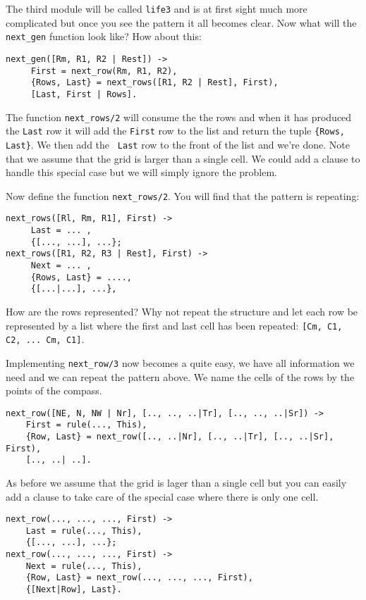 \documentclass[a4paper,11pt]{article}
\begin{document}
The third module will be called {\tt life3} and is at first sight much
more complicated but once you see the pattern it all becomes
clear. Now what will the {\tt next\_gen} function look like? How
about this:

\begin{verbatim}
next_gen([Rm, R1, R2 | Rest]) ->
     First = next_row(Rm, R1, R2),
     {Rows, Last} = next_rows([R1, R2 | Rest], First),
     [Last, First | Rows].
\end{verbatim}

The function {\tt next\_rows/2} will consume the the rows and when it
has produced the {\tt Last} row it will add the {\tt First} row to the
list and return the tuple {\tt\{Rows, Last\}}. We then add the {\tt
  Last} row to the front of the list and we're done. Note that we
assume that the grid is larger than a single cell. We could add a
clause to handle this special case but we will simply ignore the problem.

Now define the function {\tt next\_rows/2}. You will find that the
pattern is repeating:

\begin{verbatim}
next_rows([Rl, Rm, R1], First) ->
     Last = ... ,
     {[..., ...], ...};
next_rows([R1, R2, R3 | Rest], First) ->
     Next = ... ,
     {Rows, Last} = ....,
     {[...|...], ...},
\end{verbatim}

How are the rows represented? Why not repeat the structure and let
each row be represented by a list where the first and last cell has
been repeated: {\tt [Cm, C1, C2, ... Cm, C1]}. 

Implementing {\tt next\_row/3} now becomes a quite easy, we have all
information we need and we can repeat the pattern above. We name the
cells of the rows by the points of the compass.

\begin{verbatim}
next_row([NE, N, NW | Nr], [.., .., ..|Tr], [.., .., ..|Sr]) ->
    First = rule(..., This),
    {Row, Last} = next_row([.., ..|Nr], [.., ..|Tr], [.., ..|Sr], First),
    [.., ..| ..].
\end{verbatim}

As before we assume that the grid is lager than a single cell but you
can easily add a clause to take care of the special case where there
is only one cell.

\begin{verbatim}
next_row(..., ..., ..., First) ->
    Last = rule(..., This),
    {[..., ...], ...};
next_row(..., ..., ..., First) ->
    Next = rule(..., This),
    {Row, Last} = next_row(..., ..., ..., First),
    {[Next|Row], Last}.
\end{verbatim}
\end{document}
